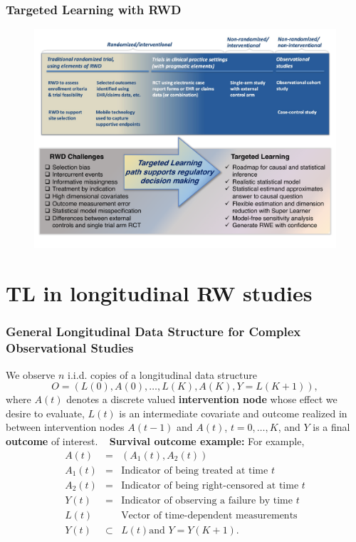 \documentclass[t]{beamer}
\begin{document}

\begin{frame}
\frametitle{Targeted Learning with RWD}
\vspace{-18pt}
\centering
\begin{figure}
\begin{center}
\includegraphics[width=1.02\textwidth]{figures/TLpath2_edit.pdf}
\end{center}
\end{figure}
\vspace{35pt}
\end{frame}

\section{TL in longitudinal RW studies}
\begin{frame}
\frametitle{General Longitudinal Data Structure for Complex Observational Studies}
We observe $n$ i.i.d. copies of a longitudinal data structure
\[
O=(L(0),A(0),\ldots,L(K),A(K),Y=L(K+1)),\]
where $A(t)$ denotes a discrete valued {\bf intervention node} whose effect we desire to evaluate,  $L(t)$ is an intermediate covariate and outcome realized in between intervention nodes $A(t-1)$ and $A(t)$, $t=0,\ldots,K$, and $Y$ is a final {\bf outcome} of interest.
\ \newline
{\bf Survival outcome example:}
For example, 
\begin{eqnarray*}
A(t)&=&(A_1(t),A_2(t))\\
A_1(t)&=& \mbox{Indicator of being treated at time $t$}\\
A_2(t)&=& \mbox{Indicator of being right-censored at time $t$}\\
Y(t)&=&\mbox{Indicator of observing a failure by time $t$}\\
L(t)&&\mbox{Vector of time-dependent measurements}\\
Y(t)&\subset& L(t)\mbox{and  $Y=Y(K+1)$}.
\end{eqnarray*}
\end{frame}
\end{document}
